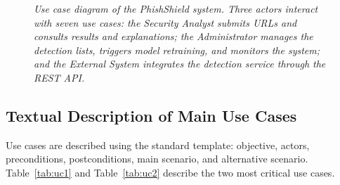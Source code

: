 \begin{figure}[H]

\vspace{8pt}
\caption{\textit{Use case diagram of the PhishShield system. Three actors interact with seven use cases: the Security Analyst submits URLs and consults results and explanations; the Administrator manages the detection lists, triggers model retraining, and monitors the system; and the External System integrates the detection service through the REST API.}}
\label{fig:usecase}
\end{figure}

\subsection{Textual Description of Main Use Cases}

Use cases are described using the standard template: objective, actors, preconditions, postconditions, main scenario, and alternative scenario. Table~\ref{tab:uc1} and Table~\ref{tab:uc2} describe the two most critical use cases.

